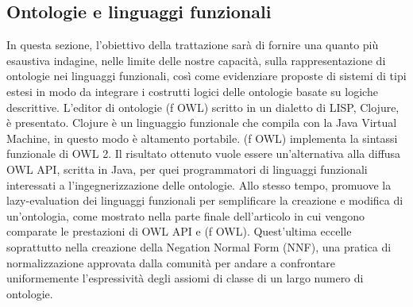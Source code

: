 \subsection{Ontologie e linguaggi funzionali}
In questa sezione, l'obiettivo della trattazione sarà di fornire una quanto più esaustiva indagine, nelle limite delle nostre capacità, sulla rappresentazione di ontologie nei linguaggi funzionali, così come evidenziare proposte di sistemi di tipi estesi in modo da integrare i costrutti logici delle ontologie basate su logiche descrittive.
L'editor di ontologie (f OWL) \cite{fOWL} scritto in un dialetto di LISP, Clojure, è presentato. Clojure è un linguaggio funzionale che compila con la Java Virtual Machine, in questo modo è altamento portabile. (f OWL) implementa la sintassi funzionale di OWL 2. Il risultato ottenuto vuole essere un'alternativa alla diffusa OWL API, scritta in Java, per quei programmatori di linguaggi funzionali interessati a l'ingegnerizzazione delle ontologie. Allo stesso tempo, promuove la lazy-evaluation dei linguaggi funzionali per semplificare la creazione e modifica di un'ontologia, come mostrato nella parte finale dell'articolo in cui vengono comparate le prestazioni di OWL API e (f OWL). Quest'ultima eccelle soprattutto nella creazione della Negation Normal Form (NNF), una pratica di normalizzazione approvata dalla comunità per andare a confrontare uniformemente l'espressività degli assiomi di classe di un largo numero di ontologie.

